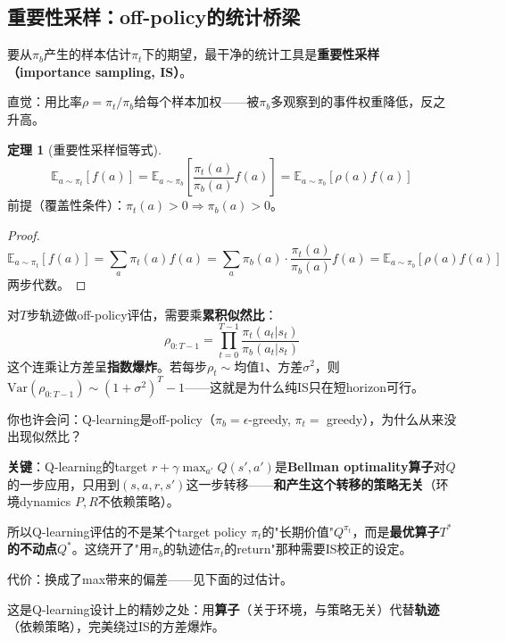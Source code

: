 \documentclass[11pt,a4paper]{article}
\theoremstyle{definition}
\newtheorem{theorem}{定理}[section]
\begin{document}
\subsection{重要性采样：off-policy的统计桥梁}

\begin{plainwords}
要从$\pi_b$产生的样本估计$\pi_t$下的期望，最干净的统计工具是\textbf{重要性采样（importance sampling, IS）}。

直觉：用比率$\rho = \pi_t/\pi_b$给每个样本加权——被$\pi_b$多观察到的事件权重降低，反之升高。
\end{plainwords}

\begin{theorem}[重要性采样恒等式]
\[
\mathbb{E}_{a \sim \pi_t}[f(a)] = \mathbb{E}_{a \sim \pi_b}\left[\frac{\pi_t(a)}{\pi_b(a)} f(a)\right] = \mathbb{E}_{a \sim \pi_b}[\rho(a) f(a)]
\]
前提（覆盖性条件）：$\pi_t(a) > 0 \Rightarrow \pi_b(a) > 0$。
\end{theorem}

\begin{proof}
\[
\mathbb{E}_{a \sim \pi_t}[f(a)] = \sum_a \pi_t(a) f(a) = \sum_a \pi_b(a) \cdot \frac{\pi_t(a)}{\pi_b(a)} f(a) = \mathbb{E}_{a \sim \pi_b}[\rho(a) f(a)]
\]
两步代数。
\end{proof}

\begin{calculation}[多步IS与方差爆炸]
对$T$步轨迹做off-policy评估，需要乘\textbf{累积似然比}：
\[
\rho_{0:T-1} = \prod_{t=0}^{T-1} \frac{\pi_t(a_t|s_t)}{\pi_b(a_t|s_t)}
\]
这个连乘让方差呈\textbf{指数爆炸}。若每步$\rho_t \sim$均值1、方差$\sigma^2$，则$\text{Var}(\rho_{0:T-1}) \sim (1+\sigma^2)^T - 1$——这就是为什么纯IS只在短horizon可行。
\end{calculation}

\begin{magicbox}[Q-learning为什么不需要IS]
你也许会问：Q-learning是off-policy（$\pi_b = \epsilon$-greedy, $\pi_t = $ greedy），为什么从来没出现似然比？

\textbf{关键}：Q-learning的target $r + \gamma\max_{a'} Q(s', a')$是\textbf{Bellman optimality算子}对$Q$的一步应用，只用到$(s, a, r, s')$这一步转移——\textbf{和产生这个转移的策略无关}（环境dynamics $P, R$不依赖策略）。

所以Q-learning评估的不是某个target policy $\pi_t$的"长期价值"$Q^{\pi_t}$，而是\textbf{最优算子$T^*$的不动点}$Q^*$。这绕开了"用$\pi_b$的轨迹估$\pi_t$的return"那种需要IS校正的设定。

代价：换成了max带来的偏差——见下面的过估计。

这是Q-learning设计上的精妙之处：用\textbf{算子}（关于环境，与策略无关）代替\textbf{轨迹}（依赖策略），完美绕过IS的方差爆炸。
\end{magicbox}
\end{document}
